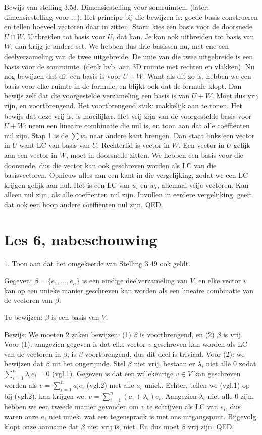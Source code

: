 \documentclass{article}
\begin{document}
Bewijs van stelling 3.53. Dimensiestelling voor somruimten. (later: dimensiestelling voor ...). Het principe bij die bewijzen is: goede basis construeren en tellen hoeveel vectoren daar in zitten. Start: kies een basis voor de doorsnede $U \cap W$. Uitbreiden tot basis voor $U$, dat kan. Je kan ook uitbreiden tot basis van $W$, dan krijg je andere set. We hebben dus drie basissen nu, met ene een deelverzameling van de twee uitgebreide. De unie van die twee uitgebreide is een basis voor de somruimte. (denk bvb. aan 3D ruimte met rechten en vlakken). Nu nog bewijzen dat dit een basis is voor $U+W$. Want als dit zo is, hebben we een basis voor elke ruimte in de formule, en blijkt ook dat de formule klopt. 
Dan bewijs zelf dat die voorgestelde verzameling een basis is van $U+W$. Moet dus vrij zijn, en voortbrengend. Het voortbrengend stuk: makkelijk aan te tonen. Het bewijs dat deze vrij is, is moeilijker. 
Het vrij zijn van de voorgestelde basis voor $U+W$: neem een lineaire combinatie die nul is, en toon aan dat alle co\"effi\"enten nul zijn. Stap 1 is de $\sum w_i$ naar andere kant brengen. Dan staat links een vector in $U$ want LC van basis van $U$. Rechterlid is vector in $W$. Een vector in $U$ gelijk aan een vector in $W$, moet in doorsnede zitten. We hebben een basis voor die doorsnede, dus die vector kan ook geschreven worden als LC van die basisvectoren. Opnieuw alles aan een kant in die vergelijking, zodat we een LC krijgen gelijk aan nul. Het is een LC van $u_i$ en $w_i$, allemaal vrije vectoren. Kan alleen nul zijn, als alle co\"effi\"enten nul zijn. Invullen in eerdere vergelijking, geeft dat ook een hoop andere co\"effi\"enten nul zijn. QED. 

\section*{Les 6, nabeschouwing}

1. Toon aan dat het omgekeerde van Stelling 3.49 ook geldt. 

Gegeven: $\beta = \{e_1, \dots , e_n\}$ is een eindige deelverzameling van $V$, en elke vector $v$ kan op een
unieke manier geschreven kan worden als een lineaire combinatie van de vectoren van $\beta$. 

Te bewijzen: $\beta$ is een basis van $V$.

Bewijs: 
We moeten 2 zaken bewijzen:  (1) $\beta$ is voortbrengend, en (2) $\beta$ is vrij. 
Voor (1): aangezien gegeven is dat elke vector $v$ geschreven kan worden als LC van de vectoren in $\beta$, is $\beta$ voortbrengend, dus dit deel is triviaal. Voor (2): we bewijzen dat $\beta$ uit het ongerijmde. Stel $\beta$ niet vrij, bestaan er $\lambda_i$ niet alle $0$ zodat $\sum_{i=1}^n \lambda_i e_i = 0$ (vgl.1). Gegeven is dat een willekeurige $v \in V$ kan geschreven worden als $v=\sum_{i=1}^n a_i e_i$ (vgl.2) met alle $a_i$ uniek. Echter, tellen we (vgl.1) op bij (vgl.2), kan krijgen we: $v=\sum_{i=1}^n (a_i + \lambda_i) e_i $. Aangezien $\lambda_i$ niet alle $0$ zijn, hebben we een tweede manier gevonden om $v$ te schrijven als LC van $e_i$, dus waren onze $a_i$ niet uniek, wat een tegenspraak is met ons uitgangspunt. Bijgevolg klopt onze aanname dat $\beta$ niet vrij is, niet. En dus moet $\beta$ vrij zijn. QED. 
\end{document}
